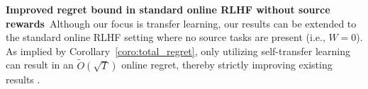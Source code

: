 \textbf{Improved regret bound in standard online RLHF without source rewards}~Although our focus is transfer learning, our results can be extended to the standard online RLHF setting where no source tasks are present (i.e., $W=0$).
As implied by Corollary~\ref{coro:total_regret}, only utilizing self-transfer learning can result in an $\tilde{O}(\sqrt{T})$ online regret, thereby strictly improving existing results \citep{xiong2024iterative, xie2024exploratory,cen2024value,zhang2024self}.
%
%
%
%
%
%
%
%
%

\iffalse
%
%
Our discussion for Case 1 enlightens the benefits when the source reward models have high quality, i.e. $\Delta_{\min}$ is small.
Note that the sub-optimality of $\pi^t_{\mix}$ depends on the accumulative regret up to step $t$. A lower $\Delta_{\min}$ implies a lower $\Coeff$ in the above analysis, which implies $\cov^{\pi^*_{r^*}|\pi_\mix^{t}}$ can have a faster convergence to 1.
%
%


%
%
\fi



%
%
%



%
%
%
%
%
%
%
%
%
%
%
%
%
%
%